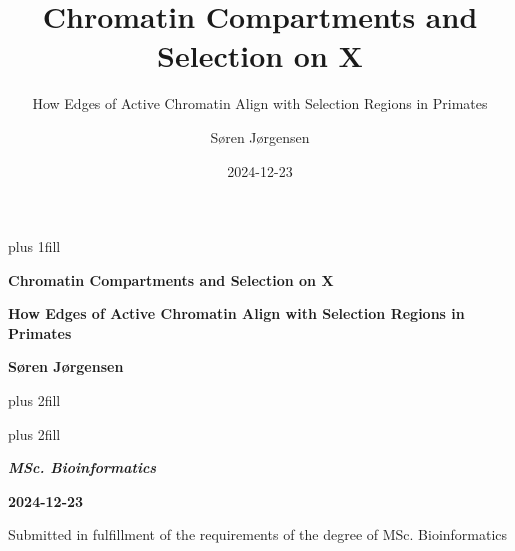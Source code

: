 \documentclass[
  11pt,
  a4paper,
]{scrbook}
\title{Chromatin Compartments and Selection on X}
\subtitle{How Edges of Active Chromatin Align with Selection Regions in
Primates}
\author{Søren Jørgensen}
\date{2024-12-23}
\begin{document}
\frontmatter
\cleardoublepage
\thispagestyle{empty}
{\centering
\hbox{}\vskip 0cm plus 1fill

{%
\Huge\bfseries Chromatin Compartments and Selection on X \par}
\vspace{3ex}
{\Large\bfseries How Edges of Active Chromatin Align with Selection
Regions in Primates \par}
\vspace{6ex}

    {\Large\bfseries Søren Jørgensen \par}
%
\vskip 0cm plus 2fill

{ \par}
\vskip 0cm plus 2fill

{\bfseries\Large\textit{MSc. Bioinformatics} \par}
\vspace{3ex}

{\bfseries\large 2024-12-23 \par}
\vspace{3ex}

\vspace{12ex}
{\small Submitted in fulfillment of the requirements
of the degree of MSc. Bioinformatics \par}
\pagebreak

}
\end{document}
